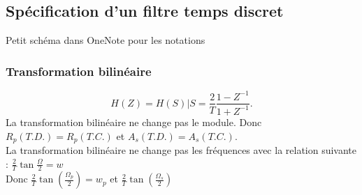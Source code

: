 \documentclass{article}
\theoremstyle{plain}%
\theoremstyle{definition}
\theoremstyle{remark}
\begin{document}
\subsection{Spécification d'un filtre temps discret}
Petit schéma dans OneNote pour les notations

\subsubsection{Transformation bilinéaire}
\[
    H(Z) = H(S) | S = \frac{2}{T} \frac{1 - Z^{-1}}{1 + Z^{-1}}
.\]
La transformation bilinéaire ne change pas le module. Donc $ R_p (T.D.) = R_p(T.C.) $ et $ A_s(T.D.) = A_s(T.C.) $. \\
La transformation bilinéaire ne change pas les fréquences avec la relation suivante : $ \frac{2}{T} \tan \frac{\Omega }{2} = w $ \\
Donc $ \frac{2}{T}\tan (\frac{\Omega_p}{2}) = w_p $ et $ \frac{2}{T} \tan (\frac{\Omega _s}{2}) $ 
\end{document}
